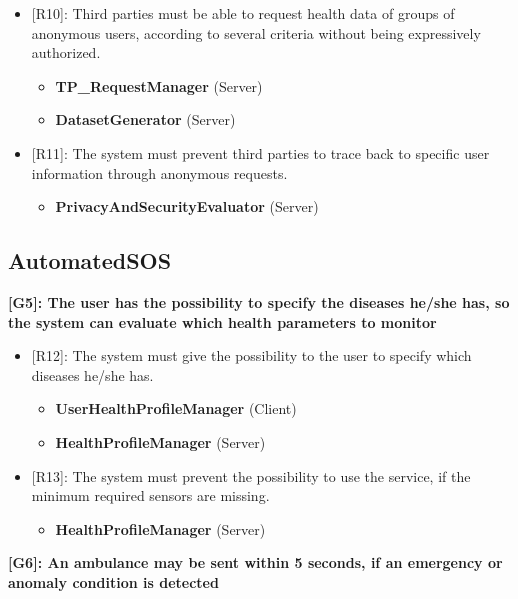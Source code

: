 \begin{itemize}
	\item {[R10]: Third parties must be able to request health data of groups of anonymous users, according to several criteria without being expressively authorized.}
	\begin{itemize}
		\item {\textbf{TP\_RequestManager} (Server)}
		\item {\textbf{DatasetGenerator} (Server)}
	\end{itemize}   
	\item {[R11]: The system must prevent third parties to trace back to specific user information through anonymous requests.}
	\begin{itemize}
		\item {\textbf{PrivacyAndSecurityEvaluator} (Server)}
	\end{itemize}   
\end{itemize}


{\color{Blue}\subsection{AutomatedSOS}}
\raggedright
\textbf{[G5]: The user has the possibility to specify the diseases he/she has, so the system can evaluate which health parameters to monitor}

\begin{itemize}
	\item {[R12]: The system must give the possibility to the user to specify which diseases he/she has.}
	\begin{itemize}
		\item {\textbf{UserHealthProfileManager} (Client)}
		\item {\textbf{HealthProfileManager} (Server)}
	\end{itemize}   
	\item {[R13]: The system must prevent the possibility to use the service, if the minimum required sensors are missing.}
	\begin{itemize}
		\item {\textbf{HealthProfileManager} (Server)}
	\end{itemize}   
\end{itemize}

\textbf{[G6]: An ambulance may be sent within 5 seconds, if an emergency or anomaly condition is detected}

